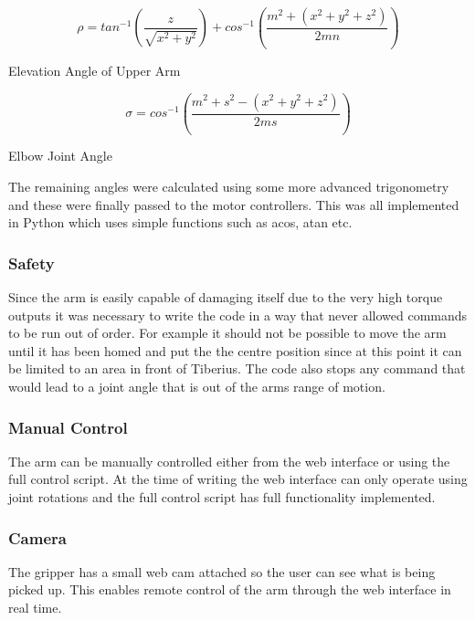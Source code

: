\begin{capequ}[!htb]
\begin{center}
\begin{equation}
\rho = tan^{-1}\left ( \frac{z}{\sqrt{{x^{2}+y^{2}}}} \right )+ cos^{-1}\left ( \frac{m^{2}+(x^{2}+y^{2}+z^{2})}{2mn} \right )
\end{equation}
\caption{Elevation Angle of Upper Arm}
\label{Equation3}
\end{center}
\end{capequ}


\begin{capequ}[!htb]
\begin{center}
\begin{equation}
\sigma = cos^{-1}\left (\frac{m^{2}+s^{2}-(x^{2}+y^{2}+z^{2})}{2ms} \right )
\end{equation}
\caption{Elbow Joint Angle}
\label{Equation5}
\end{center}
\end{capequ}

The remaining angles were calculated using some more advanced trigonometry and these were finally passed to the motor controllers.  This was all implemented in Python which uses simple functions such as acos, atan etc.


\subsubsection{Safety}
Since the arm is easily capable of damaging itself due to the very high torque outputs it was necessary to write the code in a way that never allowed commands to be run out of order. For example it should not be possible to move the arm until it has been homed and put the the centre position since at this point it can be limited to an area in front of Tiberius. The code also stops any command that would lead to a joint angle that is out of the arms range of motion.

\subsubsection{Manual Control}
The arm can be manually controlled either from the web interface or using the full control script. At the time of writing the web interface can only operate using joint rotations and the full control script has full functionality implemented.

\subsubsection{Camera}
The gripper has a small web cam attached so the user can see what is being picked up. This enables remote control of the arm through the web interface in real time.

